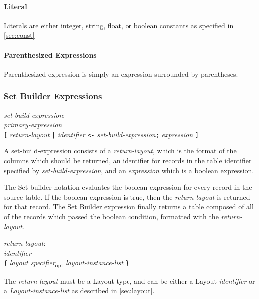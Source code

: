 \documentclass{article}
\begin{document}
\paragraph{Literal}
Literals are either integer, string, float, or boolean constants as specified in \ref{sec:const}
\paragraph{Parenthesized Expressions}
Parenthesized expression is simply an expression surrounded by parentheses. 

\subsubsection{Set Builder Expressions}
\label{sec:setbuild}
\begin{tabbing}
	\= \emph{set-bu}\=\emph{ild-expression}: \\
	\> \> \emph{primary-expression} \\
	\> \> \texttt{[} \emph{return-layout} \texttt{|} \emph{identifier} \texttt{<-} \emph{set-build-expression}\texttt{;} \emph{expression} \texttt{]}
\end{tabbing}

A set-build-expression consists of a \emph{return-layout}, which is the format of the columns which should be returned, an identifier for records in the table identifier specified by \emph{set-build-expression}, and an \emph{expression} which is a boolean expression.

 The Set-builder notation evaluates the boolean expression for every record in the source table. If the boolean expression is true, then the \emph{return-layout} is returned for that record. The Set Builder expression finally returns a table composed of all of the records which passed the boolean condition, formatted with the \emph{return-layout}.


\begin{tabbing}
	\= \emph{retu}\=\emph{rn-layout}: \\
	\> \> \emph{identifier} \\
	\> \> \texttt{\{} \emph{layout specifier}\textsubscript{opt} \emph{layout-instance-list} \texttt{\}}
\end{tabbing}
The \emph{return-layout} must be a Layout type, and can be either a Layout \emph{identifier} or a \emph{Layout-instance-list} as described in \ref{sec:layout}.
\end{document}
